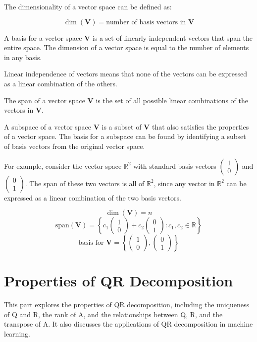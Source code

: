 \documentclass{report}%
\begin{document}
The dimensionality of a vector space can be defined as:

$$
\dim(\mathbf{V}) = \text{number of basis vectors in }\mathbf{V}
$$

A basis for a vector space $\mathbf{V}$ is a set of linearly independent vectors that span the entire space. The dimension of a vector space is equal to the number of elements in any basis.

Linear independence of vectors means that none of the vectors can be expressed as a linear combination of the others.

The span of a vector space $\mathbf{V}$ is the set of all possible linear combinations of the vectors in $\mathbf{V}$.

A subspace of a vector space $\mathbf{V}$ is a subset of $\mathbf{V}$ that also satisfies the properties of a vector space. The basis for a subspace can be found by identifying a subset of basis vectors from the original vector space.

For example, consider the vector space $\mathbb{R}^2$ with standard basis vectors $\begin{pmatrix} 1 \\ 0 \end{pmatrix}$ and $\begin{pmatrix} 0 \\ 1 \end{pmatrix}$. The span of these two vectors is all of $\mathbb{R}^2$, since any vector in $\mathbb{R}^2$ can be expressed as a linear combination of the two basis vectors.

$$
\dim(\mathbf{V}) = n
$$
$$
\text{span}(\mathbf{V}) = \left\{ c_1\begin{pmatrix} 1 \\ 0 \end{pmatrix} + c_2\begin{pmatrix} 0 \\ 1 \end{pmatrix} : c_1, c_2 \in \mathbb{R} \right\}
$$
$$
\text{basis for }\mathbf{V} = \left\{ \begin{pmatrix} 1 \\ 0 \end{pmatrix}, \begin{pmatrix} 0 \\ 1 \end{pmatrix} \right\}
$$%
\section{Properties of QR Decomposition}%
This part explores the properties of QR decomposition, including the uniqueness of Q and R, the rank of A, and the relationships between Q, R, and the transpose of A. It also discusses the applications of QR decomposition in machine learning.
\end{document}
